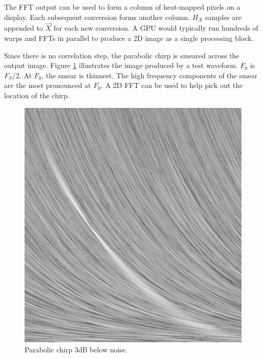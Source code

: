 The FFT output can be used to form a column of heat-mapped pixels on a display.
Each subsequent conversion forms another column.
$H_X$ samples are appended to $\vec{X}$ for each new conversion.
A GPU would typically run hundreds of warps and FFTs in parallel to produce a
2D image as a single processing block.

Since there is no correlation step, the parabolic chirp is smeared across the
output image.
Figure \ref{fig:p4kbw3} illustrates the image produced by a test waveform.
$F_0$ is $F_S/2$.
At $F_0$, the smear is thinnest.
The high frequency components of the smear are the most pronounced at $F_0$.
A 2D FFT can be used to help pick out the location of the chirp.

\begin{figure}
  \includegraphics[width=0.8\linewidth]{../source/p4kbw3.jpg}
  \caption{Parabolic chirp 3dB below noise.}
  \label{fig:p4kbw3}
\end{figure}

